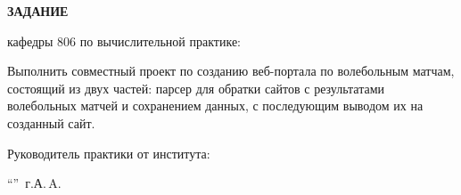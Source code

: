 \begin{center}
\bfseries{\large ЗАДАНИЕ}
\end{center}

кафедры 806 по вычислительной практике:

Выполнить совместный проект по созданию веб-портала по волебольным матчам, состоящий из двух частей: парсер для обратки сайтов с результатами волебольных матчей и сохранением данных, с последующим выводом их на созданный сайт.

\vspace*{\fill}
Руководитель практики от института:

\vspace{5pt}
\enquote{\hspace{0.5cm}}  \the\year\,г. А.\,A. 
\pagebreak
